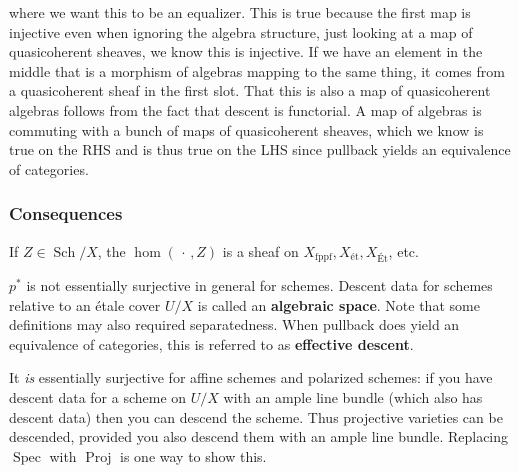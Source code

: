 where we want this to be an equalizer. This is true because the first
map is injective even when ignoring the algebra structure, just looking
at a map of quasicoherent sheaves, we know this is injective. If we have
an element in the middle that is a morphism of algebras mapping to the
same thing, it comes from a quasicoherent sheaf in the first slot. That
this is also a map of quasicoherent algebras follows from the fact that
descent is functorial. A map of algebras is commuting with a bunch of
maps of quasicoherent sheaves, which we know is true on the RHS and is
thus true on the LHS since pullback yields an equivalence of categories.

\hypertarget{consequences}{%
\subsubsection{Consequences}\label{consequences}}

\begin{corollary}[?]

If \(Z \in {\operatorname{Sch}}/X\), the \(\hom({\,\cdot\,}, Z)\) is a
sheaf on
\(X_{\mathrm{\operatorname{fppf}}}, X_{\text{ét}}, X_{\text{Ét}}\), etc.

\end{corollary}

\begin{remark}

\(p^*\) is not essentially surjective in general for schemes. Descent
data for schemes relative to an étale cover \(U/X\) is called an
\textbf{algebraic space}. Note that some definitions may also required
separatedness. When pullback does yield an equivalence of categories,
this is referred to as \textbf{effective descent}.

It \emph{is} essentially surjective for affine schemes and polarized
schemes: if you have descent data for a scheme on \(U/X\) with an ample
line bundle (which also has descent data) then you can descend the
scheme. Thus projective varieties can be descended, provided you also
descend them with an ample line bundle. Replacing
\(\operatorname{Spec}\) with \(\operatorname{Proj}\) is one way to show
this.

\end{remark}

